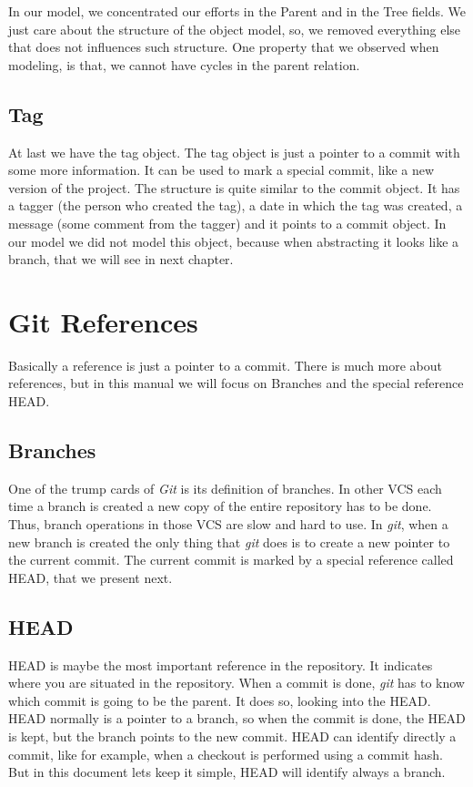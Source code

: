 In our model, we concentrated our efforts in the Parent and in the
Tree fields. We just care about the structure of the object model, so,
we removed everything else that does not influences such
structure. One property that we observed when modeling, is that, we
cannot have cycles in the parent relation.

\subsection{Tag}
At last we have the tag object. The tag object is just a pointer to
a commit with some more information. It can be used to mark a special 
commit, like a new version of the project. The structure is quite 
similar to the commit object. It has a tagger (the person who created 
the tag), a date in which the tag was created, a message (some
comment from the tagger) and it points to a commit object. In our
model we did not model this object, because when abstracting it looks
like a branch, that we will see in next chapter.

\section{Git References}
Basically a reference is just a pointer to a commit. There is much
more about references, but in this manual we will focus on
Branches and the special reference HEAD.

\subsection{Branches}
One of the trump cards of \emph{Git} is its definition of branches. In other
VCS each time a branch is created a new copy of the entire repository
has to be done. Thus, branch operations in those VCS are slow and hard to use. 
In \emph{git}, when a new branch is created the only thing that
\emph{git} does is to create a new pointer to the current
commit. The current commit is marked by a special reference called
HEAD, that we present next.

\subsection{HEAD}
HEAD is maybe the most important reference in the repository. It
indicates where you are situated in the repository. When a commit is
done, \emph{git} has to know which commit is going to be the parent. 
It does so, looking into the HEAD. HEAD normally is a
pointer to a branch, so when the commit is done, the HEAD is kept, but
the branch points to the new commit. HEAD can identify directly a
commit, like for example, when a checkout is performed using a commit hash. But in this document lets keep it simple, HEAD will identify always a branch.

